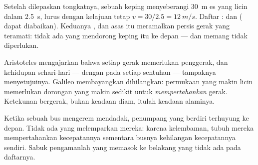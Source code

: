\begin{example}\label{ex:g10:inertia:puck}
Setelah dilepaskan tongkatnya, sebuah keping menyeberangi \qty{30}{m}
es yang licin dalam \qty{2.5}{s}, lurus dengan kelajuan tetap
$v = 30/2.5 = \qty{12}{m/s}$. Daftar :  dan 
( dapat diabaikan). Keduanya , dan asas itu
meramalkan persis gerak yang teramati: tidak ada yang mendorong keping
itu ke depan --- dan memang tidak diperlukan.
\end{example}

\begin{remark}
Aristoteles mengajarkan bahwa setiap gerak memerlukan penggerak, dan
kehidupan sehari-hari --- dengan  pada setiap sentuhan ---
tampaknya menyetujuinya. Galileo membayangkan  dihilangkan:
permukaan yang makin licin memerlukan dorongan yang makin sedikit untuk
\emph{mempertahankan} gerak. Ketekunan bergerak, bukan keadaan diam,
itulah keadaan alaminya.
\end{remark}

\begin{remark}
Ketika sebuah bus mengerem mendadak, penumpang yang berdiri terhuyung
ke depan. Tidak ada  yang melemparkan mereka: karena kelembaman,
tubuh mereka mempertahankan kecepatannya sementara busnya kehilangan
kecepatannya sendiri. Sabuk pengamanlah yang memasok  ke belakang
yang tidak ada pada daftarnya.
\end{remark}

